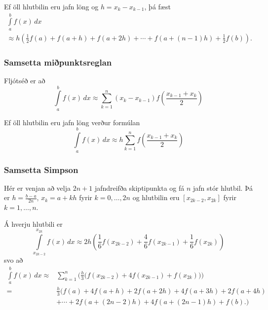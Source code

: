 \documentclass[icelandic,a4paper,12pt]{article}
\begin{document}
\pause
\smallskip
Ef öll hlutbilin eru jafn löng og $h = x_k-x_{k-1}$, \pause
þá fæst
\begin{multline*}
  \int\limits_a^b f(x) \, dx \\
  \approx 
  h\left( \frac{1}{2}f(a) + f(a+h) + f(a+2h) 
    + \cdots + f(a+(n-1)h) + \frac{1}{2}f(b) \right).
\end{multline*}


\subsubsection{Samsetta miðpunktsreglan} 
Fljótséð er að
\begin{equation*}
  \int\limits_a^b f(x) \, dx
  \approx
  \sum\limits_{k=1}^n (x_k-x_{k-1})f
  \left(
    \frac{x_{k-1}+x_k}{2}
  \right)
\end{equation*}

\pause
\smallskip
Ef öll hlutbilin eru jafn löng verður formúlan
\begin{equation*}
  \int\limits_a^b f(x) \, dx
  \approx
  h \sum\limits_{k=1}^n f \left(\frac{x_{k-1}+x_k}{2}\right)
\end{equation*}



\subsubsection{Samsetta Simpson}
Hér er venjan að velja $2n+1$ jafndreifða skiptipunkta og fá $n$ jafn
stór hlutbil. Þá er $h = \frac{b-a}{2n}$, $x_k = a + kh$ fyrir $k =
0,\ldots,2n$ og hlutbilin eru $[x_{2k-2},x_{2k}]$ fyrir $k = 1,
\ldots, n$. 

\pause
\smallskip
Á hverju hlutbili er 
\begin{equation*}
  \int\limits_{x_{2k-2}}^{x_{2k}} f(x) \, dx
  \approx
  2h \left(
    \frac{1}{6} f(x_{2k-2}) + \frac{4}{6} f(x_{2k-1}) 
    + \frac{1}{6} f(x_{2k})
  \right)
\end{equation*}
\pause
svo að
{\small 
\begin{align*}
  \int\limits_a^b f(x) \, dx
  \approx &
  \sum\limits_{k=1}^n
  \bigg(
    \frac{h}{3}
    \Big(
      f(x_{2k-2}) + 4f(x_{2k-1}) + f(x_{2k})
    \Big)
  \bigg) \\
  = &
  \frac{h}{3}
  \Big( 
    f(a) + 4f(a+h) + 2f(a+2h)+ 4f(a+3h) + 2f(a+4h) \\
    &+ \cdots + 2f(a+(2n-2)h) + 4f(a+(2n-1)h) + f(b).
  \Big)
\end{align*}}
\end{document}
